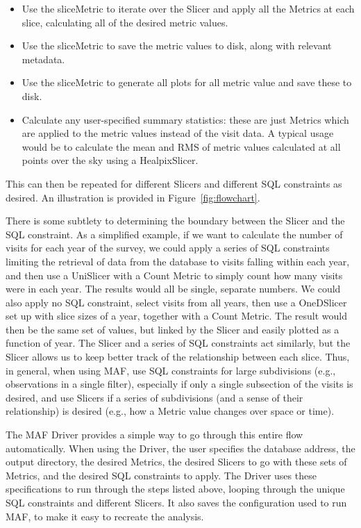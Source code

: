 \documentclass[]{spie}  %
\begin{document}
\begin{itemize}
{sliceMetric.}
\item{Use the sliceMetric to iterate over the Slicer and apply all the
Metrics at each slice, calculating all of the desired metric values.}
\item{Use the sliceMetric to save the metric values to disk, along
with relevant metadata.}
\item{Use the sliceMetric to generate all plots for all metric value
and save these to disk.}
\item{Calculate any user-specified summary statistics: these are just
    Metrics which are applied to the metric values instead of the
    visit data. A typical usage would be to calculate the mean and RMS
    of metric values calculated at all points over the sky using a HealpixSlicer.}
\end{itemize}
This can then be repeated for different Slicers and different SQL
constraints as desired. An illustration is provided in
Figure~\ref{fig:flowchart}. 

There is some subtlety to determining the boundary between the Slicer
and the SQL constraint. As a simplified example, if we want to
calculate the number of visits for each year of the survey, we could
apply a series of SQL constraints limiting the retrieval of data from
the database to visits falling within each year, and then use a
UniSlicer with a Count Metric to simply count how many visits were in
each year. The results would all be single, separate numbers. We could
also apply no SQL constraint, select visits from all years, then use a
OneDSlicer set up with slice sizes of a year, together with a Count
Metric. The result would then be the same set of values, but linked by
the Slicer and easily plotted as a function of year. The Slicer and a
series of SQL constraints act similarly, but the Slicer allows us to
keep better track of the relationship between each slice. Thus, in
general, when using MAF, use SQL constraints for large subdivisions
(e.g., observations in a single filter), especially if only a single
subsection of the visits is desired, and use Slicers if a series of
subdivisions (and a sense of their relationship) is desired (e.g., how
a Metric value changes over space or time).

The MAF Driver provides a simple way to go through this entire flow
automatically. When using the Driver, the user specifies the database
address, the output directory, the desired Metrics, the desired
Slicers to go with these sets of Metrics, and the desired SQL
constraints to apply. The Driver uses these specifications to run
through the steps listed above, looping through the unique SQL
constraints and different Slicers. It also saves the configuration
used to run MAF, to make it easy to recreate the analysis. 
\end{document}
